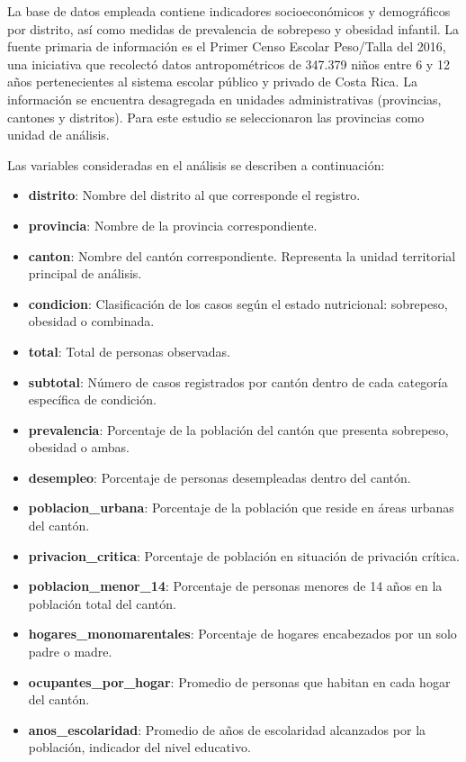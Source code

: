\documentclass[
]{article}
\begin{document}
La base de datos empleada contiene indicadores socioeconómicos y
demográficos por distrito, así como medidas de prevalencia de sobrepeso
y obesidad infantil. La fuente primaria de información es el Primer
Censo Escolar Peso/Talla del 2016, una iniciativa que recolectó datos
antropométricos de 347.379 niños entre 6 y 12 años pertenecientes al
sistema escolar público y privado de Costa Rica. La información se
encuentra desagregada en unidades administrativas (provincias, cantones
y distritos). Para este estudio se seleccionaron las provincias como
unidad de análisis.

Las variables consideradas en el análisis se describen a continuación:

\begin{itemize}
\item
  \textbf{distrito}: Nombre del distrito al que corresponde el registro.
\item
  \textbf{provincia}: Nombre de la provincia correspondiente.
\item
  \textbf{canton}: Nombre del cantón correspondiente. Representa la
  unidad territorial principal de análisis.
\item
  \textbf{condicion}: Clasificación de los casos según el estado
  nutricional: sobrepeso, obesidad o combinada.
\item
  \textbf{total}: Total de personas observadas.
\item
  \textbf{subtotal}: Número de casos registrados por cantón dentro de
  cada categoría específica de condición.
\item
  \textbf{prevalencia}: Porcentaje de la población del cantón que
  presenta sobrepeso, obesidad o ambas.
\item
  \textbf{desempleo}: Porcentaje de personas desempleadas dentro del
  cantón.
\item
  \textbf{poblacion\_urbana}: Porcentaje de la población que reside en
  áreas urbanas del cantón.
\item
  \textbf{privacion\_critica}: Porcentaje de población en situación de
  privación crítica.
\item
  \textbf{poblacion\_menor\_14}: Porcentaje de personas menores de 14
  años en la población total del cantón.
\item
  \textbf{hogares\_monomarentales}: Porcentaje de hogares encabezados
  por un solo padre o madre.
\item
  \textbf{ocupantes\_por\_hogar}: Promedio de personas que habitan en
  cada hogar del cantón.
\item
  \textbf{anos\_escolaridad}: Promedio de años de escolaridad alcanzados
  por la población, indicador del nivel educativo.
\end{itemize}
\end{document}
